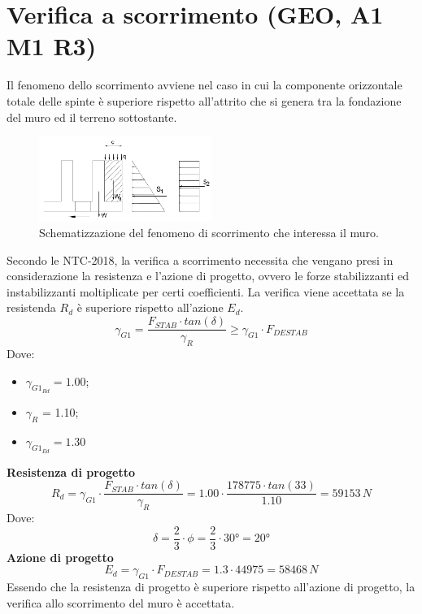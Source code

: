 \section{Verifica a scorrimento (GEO, A1 M1 R3)}
Il fenomeno dello scorrimento avviene nel caso in cui la componente orizzontale totale delle spinte è superiore rispetto all'attrito che si genera tra la fondazione del muro ed il terreno sottostante.
\begin{figure}[H]
    \centering
    \includegraphics[width=0.5\textwidth]{immagini/scorrimento.png} \hfill
        \caption{Schematizzazione del fenomeno di scorrimento che interessa il muro.}
    \label{figure:pesi_muro}
\end{figure}
Secondo le NTC-2018, la verifica a scorrimento necessita che vengano presi in considerazione la resistenza e l'azione di progetto, ovvero le forze stabilizzanti ed instabilizzanti moltiplicate per certi coefficienti. La verifica viene accettata se la resistenda $R_d$ è superiore rispetto all'azione $E_d$.
\begin{equation*}
    \gamma_{G1} = \frac{F_{STAB} \cdot tan(\delta)}{\gamma_R} \geq \gamma_{G1} \cdot F_{DESTAB}
\end{equation*}
Dove: 
\begin{itemize}
    \item $\gamma_{G1_{Rd}} = 1.00$;
    \item $\gamma_R$ = 1.10;
    \item $\gamma_{G1_{Ed}} = 1.30$
\end{itemize}
\textbf{Resistenza di progetto}
\begin{equation*}
    R_d = \gamma_{G1} \cdot \frac{F_{STAB} \cdot tan(\delta)}{\gamma_R} = 1.00 \cdot \frac{178775 \cdot tan(33)}{1.10} = 59153 \,N
\end{equation*}
Dove:
\begin{equation*}
\delta = \frac{2}{3}  \cdot \phi = \frac{2}{3} \cdot 30° = 20°
\end{equation*}
\textbf{Azione di progetto}
\begin{equation*}
    E_d = \gamma_{G1} \cdot F_{DESTAB} = 1.3 \cdot 44975 = 58468 \,N
\end{equation*}
Essendo che la resistenza di progetto è superiore rispetto all'azione di progetto, la verifica allo scorrimento del muro è accettata.

